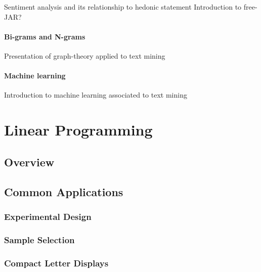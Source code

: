 \documentclass[
]{book}
\begin{document}
Sentiment analysis and its relationship to hedonic statement
Introduction to free-JAR?

\hypertarget{bi-grams-and-n-grams}{%
\subsubsection{Bi-grams and N-grams}\label{bi-grams-and-n-grams}}

Presentation of graph-theory applied to text mining

\hypertarget{machine-learning}{%
\subsubsection{Machine learning}\label{machine-learning}}

Introduction to machine learning associated to text mining

\hypertarget{linear-programming}{%
\chapter{Linear Programming}\label{linear-programming}}

\hypertarget{overview-2}{%
\section{Overview}\label{overview-2}}

\hypertarget{common-applications-2}{%
\section{Common Applications}\label{common-applications-2}}

\hypertarget{experimental-design}{%
\subsection{Experimental Design}\label{experimental-design}}

\hypertarget{sample-selection}{%
\subsection{Sample Selection}\label{sample-selection}}

\hypertarget{compact-letter-displays}{%
\subsection{Compact Letter Displays}\label{compact-letter-displays}}
\end{document}
